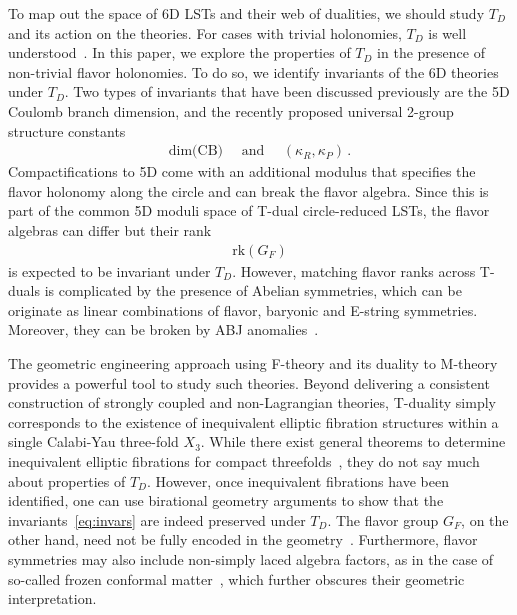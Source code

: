 \documentclass[11pt]{article}
\numberwithin{equation}{section}
\newcommand{\DimCB}{\text{dim(CB)}}
\newcommand{\rk}{\text{rk}}
\begin{document}
To map out the space of 6D LSTs and their web of dualities, we should study $T_D$ and its action on the theories. For cases with trivial holonomies, $T_D$ is well understood~\cite{Aspinwall:1997ye}. In this paper, we explore the properties of $T_D$ in the presence of non-trivial flavor holonomies. To do so, we identify invariants of the 6D theories under $T_D$. Two types of invariants that have been discussed previously are the 5D Coulomb branch dimension, and the recently proposed universal 2-group structure constants~\cite{DelZotto:2020sop}
\begin{align}
\label{eq:invars}
    \DimCB  \quad \text{ and } \quad (\kappa_R,\kappa_P) \, .
\end{align} 
Compactifications to 5D come with an additional modulus that specifies the flavor holonomy along the circle and can break the flavor algebra. Since this is part of the common 5D moduli space of T-dual circle-reduced LSTs, the flavor algebras can differ but their rank
\begin{align}
    \rk(G_F)
\end{align}
is expected to be invariant under $T_D$. However, matching flavor ranks across T-duals is complicated by the presence of Abelian symmetries, which can be originate as linear combinations of flavor, baryonic and E-string symmetries. Moreover, they can be broken by ABJ anomalies~\cite{Lee:2018ihr,Apruzzi:2020eqi}. 

The geometric engineering approach using F-theory and its duality to M-theory provides a powerful tool to study such theories. Beyond delivering a consistent construction of strongly coupled and non-Lagrangian theories, T-duality simply corresponds to the existence of inequivalent elliptic fibration structures within a single Calabi-Yau three-fold $X_3$. While there exist general theorems to determine inequivalent elliptic fibrations for compact threefolds~\cite{Kollar:2012pv, Anderson:2016cdu,Grimm:2019bey,Huang:2019pne}, they do not say much about properties of $T_D$. However, once inequivalent fibrations have been identified, one can use birational geometry arguments to show that the invariants~\eqref{eq:invars} are indeed preserved under $T_D$. The flavor group $G_F$, on the other hand, need not be fully encoded in the geometry~\cite{Bertolini:2015bwa}. Furthermore, flavor symmetries may also include non-simply laced algebra factors, as in the case of so-called frozen conformal matter~\cite{Mekareeya:2017jgc}, which further obscures their geometric interpretation. 
\end{document}
